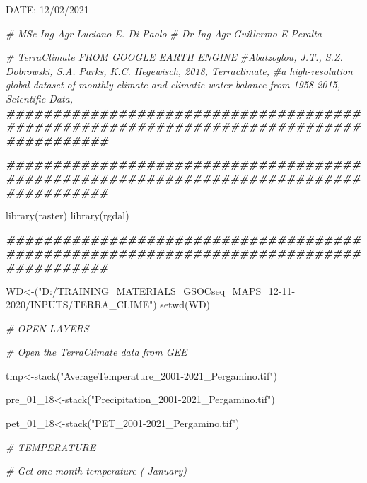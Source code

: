\documentclass[
  10pt,
  b5paper,
]{book}
\newenvironment{Shaded}{\begin{snugshade}}{\end{snugshade}}
\newcommand{\CommentTok}[1]{\textcolor[rgb]{0.56,0.35,0.01}{\textit{#1}}}
\newcommand{\DecValTok}[1]{\textcolor[rgb]{0.00,0.00,0.81}{#1}}
\newcommand{\DocumentationTok}[1]{\textcolor[rgb]{0.56,0.35,0.01}{\textbf{\textit{#1}}}}
\newcommand{\FunctionTok}[1]{\textcolor[rgb]{0.00,0.00,0.00}{#1}}
\newcommand{\NormalTok}[1]{#1}
\newcommand{\OtherTok}[1]{\textcolor[rgb]{0.56,0.35,0.01}{#1}}
\newcommand{\SpecialCharTok}[1]{\textcolor[rgb]{0.00,0.00,0.00}{#1}}
\newcommand{\StringTok}[1]{\textcolor[rgb]{0.31,0.60,0.02}{#1}}
\begin{document}
\begin{Shaded}
\begin{Highlighting}[]
\NormalTok{DATE}\SpecialCharTok{:} \DecValTok{12}\SpecialCharTok{/}\DecValTok{02}\SpecialCharTok{/}\DecValTok{2021}

\CommentTok{\#  MSc Ing Agr Luciano E. Di Paolo}
\CommentTok{\#  Dr Ing Agr Guillermo E Peralta}



\CommentTok{\# TerraClimate FROM GOOGLE EARTH ENGINE}
\CommentTok{\#Abatzoglou, J.T., S.Z. Dobrowski, S.A. Parks, K.C. Hegewisch, 2018, Terraclimate, }
\CommentTok{\#a high{-}resolution global dataset of monthly climate and climatic water balance from 1958{-}2015, Scientific Data,}
\DocumentationTok{\#\#\#\#\#\#\#\#\#\#\#\#\#\#\#\#\#\#\#\#\#\#\#\#\#\#\#\#\#\#\#\#\#\#\#\#\#\#\#\#\#\#\#\#\#\#\#\#\#\#\#\#\#\#\#\#\#\#\#\#\#\#\#\#\#\#\#\#\#\#\#\#\#\#\#\#\#\#\#\#\#\#\#\#\#\#\#}

\DocumentationTok{\#\#\#\#\#\#\#\#\#\#\#\#\#\#\#\#\#\#\#\#\#\#\#\#\#\#\#\#\#\#\#\#\#\#\#\#\#\#\#\#\#\#\#\#\#\#\#\#\#\#\#\#\#\#\#\#\#\#\#\#\#\#\#\#\#\#\#\#\#\#\#\#\#\#\#\#\#\#\#\#\#\#\#\#\#\#\#}

\FunctionTok{library}\NormalTok{(raster)}
\FunctionTok{library}\NormalTok{(rgdal)}

\DocumentationTok{\#\#\#\#\#\#\#\#\#\#\#\#\#\#\#\#\#\#\#\#\#\#\#\#\#\#\#\#\#\#\#\#\#\#\#\#\#\#\#\#\#\#\#\#\#\#\#\#\#\#\#\#\#\#\#\#\#\#\#\#\#\#\#\#\#\#\#\#\#\#\#\#\#\#\#\#\#\#\#\#\#\#\#\#\#\#\#}

\NormalTok{WD}\OtherTok{\textless{}{-}}\NormalTok{(}\StringTok{"D:/TRAINING\_MATERIALS\_GSOCseq\_MAPS\_12{-}11{-}2020/INPUTS/TERRA\_CLIME"}\NormalTok{)}
\FunctionTok{setwd}\NormalTok{(WD)}

\CommentTok{\# OPEN LAYERS}


\CommentTok{\# Open the TerraClimate data from GEE}

\NormalTok{tmp}\OtherTok{\textless{}{-}}\FunctionTok{stack}\NormalTok{(}\StringTok{"AverageTemperature\_2001{-}2021\_Pergamino.tif"}\NormalTok{)}

\NormalTok{pre\_01\_18}\OtherTok{\textless{}{-}}\FunctionTok{stack}\NormalTok{(}\StringTok{"Precipitation\_2001{-}2021\_Pergamino.tif"}\NormalTok{)}

\NormalTok{pet\_01\_18}\OtherTok{\textless{}{-}}\FunctionTok{stack}\NormalTok{(}\StringTok{"PET\_2001{-}2021\_Pergamino.tif"}\NormalTok{)}

\CommentTok{\# TEMPERATURE}


\CommentTok{\# Get one month temperature ( January)}


\end{Highlighting}
\end{Shaded}
\end{document}
